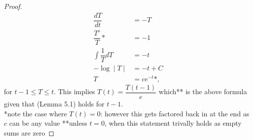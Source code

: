 \documentclass{article}
\begin{document}
\begin{solution*}
\begin{proof}
\begin{align*}
            \dfrac{dT}{dt} &= -T \\ 
            \dfrac{T'}{T}* &= -1 \\
            \int \dfrac{1}{T} dT &= -t \\ 
            - \log \mid T\mid &= -t + C \\ 
            T &= ce^{-t} *,
        \end{align*}
        for $t-1\le T\le t$. This implies $T(t) = \dfrac{T(t-1)}{e}$ which** is the above formula given that (Lemma 5.1)
        holds for $t-1$. \\
        *note the case where $T(t) = 0$: however this gets factored back in at the end as $c$ can be any value
        **unless $t=0$, when this statement trivally holds as empty sums are zero
    \end{proof}
    
\end{solution*}
\end{document}
